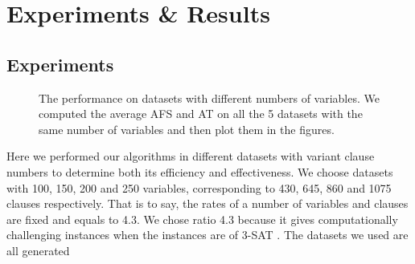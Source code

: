 
\section{Experiments \& Results}
\subsection{Experiments}
\begin{figure}[htbp]
	\centering
	\caption{The performance on datasets with different numbers of variables. We computed
		the average AFS and AT on all the 5 datasets with the same number of variables
		and then plot them in the figures.}
	\label{fig:performance}
\end{figure}
Here we performed our algorithms in different datasets with variant clause
numbers to determine both its efficiency and effectiveness. We choose datasets
with 100, 150, 200 and 250 variables, corresponding to 430, 645, 860 and 1075
clauses respectively. That is to say, the rates of a number of variables and
clauses are fixed and equals to 4.3. We chose ratio 4.3 because it gives computationally challenging instances when the instances are of 3-SAT \parencite{BenchmarksRatio}. The datasets we used are all generated
